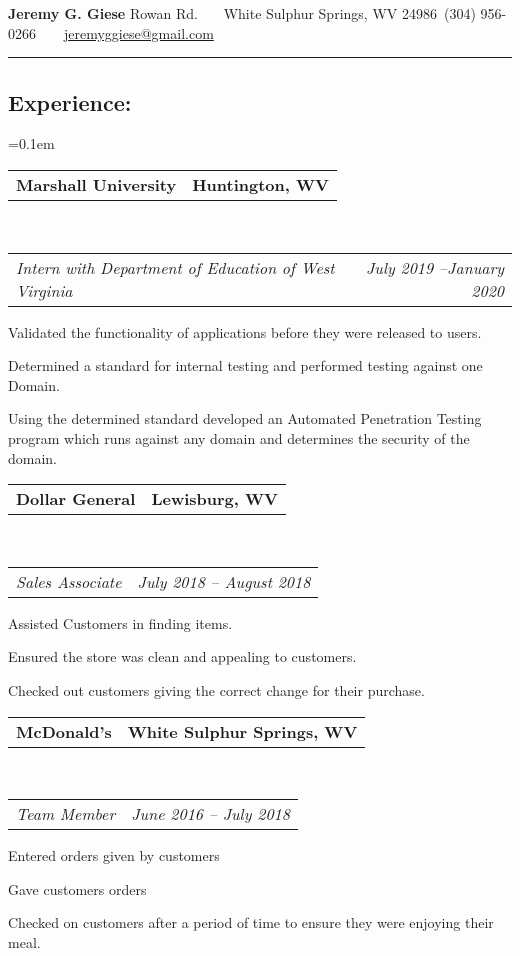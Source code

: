 \documentclass[10pt,letterpaper]{article}
\makeatletter
\newcommand{\headerrow}[2]
{\begin{tabular*}{\linewidth}{l@{\extracolsep{\fill}}r}
	#1 &
	#2 \\
\end{tabular*}}
\makeatother
\begin{document}
\begin{center}
{\LARGE \textbf{Jeremy G. Giese}}
 Rowan Rd.~\smallbreak
\ \ White Sulphur Springs, WV 24986\smallbreak\
(304) 956-0266\smallbreak\ \ 
\ \ \href{mailto:jeremyggiese@gmail.com}{jeremyggiese@gmail.com}\\
\end{center}

\hrule
\vspace{-0.4em}
\subsection*{\Large{Experience:}}

	\parskip=0.1em

	\headerrow
		{\textbf{Marshall University}}
		{\textbf{Huntington, WV}}
	\\
	\headerrow
		{\hspace{0.5cm}\emph{Intern with Department of Education of West Virginia}}
		{\emph{July 2019 --January 2020}}
	\begin{itemize*}
		\item Validated the functionality of applications before they were released to users.
		\item Determined a standard for internal testing and performed testing against one Domain.
		\item Using the determined standard developed an Automated Penetration Testing program which runs against any domain and determines the security of the domain.
		\end{itemize*}

	\headerrow
		{\hspace{-0.5cm}\textbf{Dollar General}}
		{\textbf{Lewisburg, WV}}
	\\
	\headerrow
		{\hspace{0.5cm}\emph{Sales Associate}}
		{\emph{July 2018 -- August 2018}}
	\begin{itemize*}
		\item Assisted Customers in finding items.
		\item Ensured the store was clean and appealing to customers.
		\item Checked out customers giving the correct change for their purchase.
	\end{itemize*}

	\headerrow
		{\hspace{-0.5cm}\textbf{McDonald's}}
		{\textbf{White Sulphur Springs, WV}}
	\\
	\headerrow
		{\hspace{0.5cm}\emph{Team Member}}
		{\emph{June 2016 -- July 2018}}
	\begin{itemize*}
		\item Entered orders given by customers
		\item Gave customers orders
		\item Checked on customers after a period of time to ensure they were enjoying their meal.
	\end{itemize*}
\end{document}
